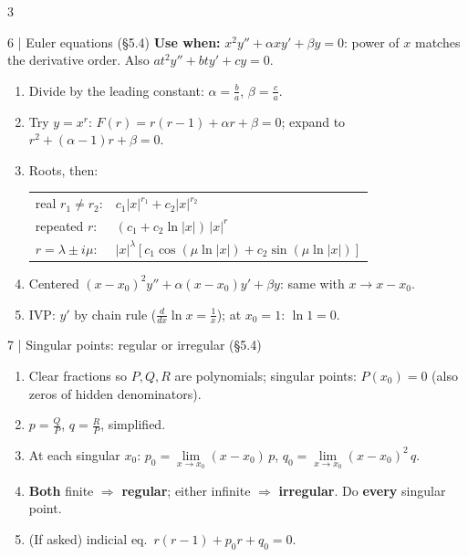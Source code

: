 \documentclass[8pt]{extarticle}
\newcommand{\key}[1]{\textcolor{grn}{\textbf{#1}}}
\newcommand{\when}[1]{\textcolor{amb}{\textbf{Use when:}} #1\par}
\begin{document}
\begin{multicols*}{3}
\begin{card}{6 \;|\; Euler equations (\S5.4)}
\when{$x^2y''+\alpha xy'+\beta y=0$: power of $x$ matches the derivative order. Also $at^2y''+bty'+cy=0$.}
\begin{enumerate}
\item Divide by the leading constant: $\alpha=\frac ba$, $\beta=\frac ca$.
\item Try $y=x^r$: \;$F(r)=r(r-1)+\alpha r+\beta=0$; expand to $r^2+(\alpha-1)r+\beta=0$.
\item Roots, then:\\[0.5pt]
\begin{tabular}{@{}l@{\;}l@{}}
real $r_1\ne r_2$: & $c_1|x|^{r_1}+c_2|x|^{r_2}$\\
repeated $r$: & $(c_1+c_2\ln|x|)\,|x|^r$\\
$r=\lambda\pm i\mu$: & $|x|^\lambda[c_1\cos(\mu\ln|x|)+c_2\sin(\mu\ln|x|)]$
\end{tabular}
\item Centered $(x-x_0)^2y''+\alpha(x-x_0)y'+\beta y$: same with $x\to x-x_0$.
\item IVP: $y'$ by chain rule ($\frac{d}{dx}\ln x=\frac1x$); at $x_0=1$: $\ln1=0$.
\end{enumerate}
\end{card}

\begin{card}{7 \;|\; Singular points: regular or irregular (\S5.4)}
\begin{enumerate}
\item Clear fractions so $P,Q,R$ are polynomials; singular points: $P(x_0)=0$ (also zeros of hidden denominators).
\item $p=\frac QP$, $q=\frac RP$, simplified.
\item At each singular $x_0$: \;$p_0=\lim\limits_{x\to x_0}(x-x_0)\,p$, \;$q_0=\lim\limits_{x\to x_0}(x-x_0)^2\,q$.
\item \textbf{Both} finite $\Rightarrow$ \key{regular}; either infinite $\Rightarrow$ \key{irregular}. Do \textbf{every} singular point.
\item (If asked) indicial eq.\ $r(r-1)+p_0r+q_0=0$.
\end{enumerate}
\end{card}


\end{multicols*}
\end{document}
